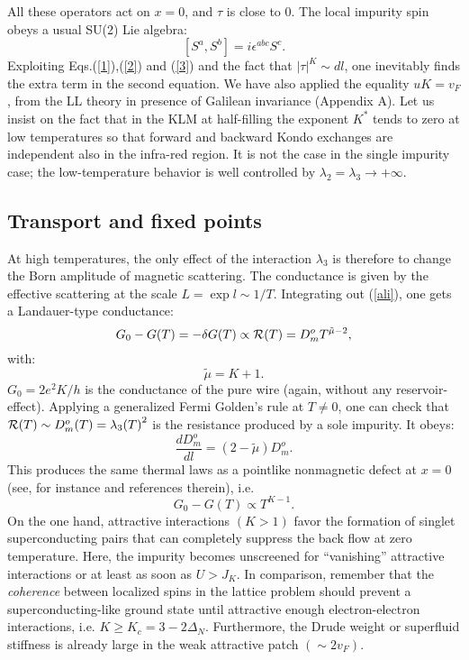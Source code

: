 All these operators act on $x=0$, and $\tau$ is close to 0.
The local impurity spin obeys a usual SU(2) Lie algebra:
\begin{equation}
\label{3}
[S^a,S^b]=i\epsilon^{abc}S^c.
\end{equation}
Exploiting Eqs.(\ref{1}),(\ref{2}) and (\ref{3})
and the fact that $\left|\tau\right|^K\sim dl$, one
inevitably finds the extra term in the second equation. We have also
applied the equality $uK=v_F$, from the LL theory in
presence of Galilean invariance (Appendix A).
Let
us insist on the fact that in the KLM at half-filling
the exponent $K^*$ tends to zero at
low temperatures so that
forward and backward Kondo exchanges are independent
also in the infra-red region.
It is not the case in the single impurity case;
the low-temperature behavior is well controlled by
$\lambda_2=\lambda_3\rightarrow +\infty$. 

\subsection{Transport and fixed points}

At high temperatures, the only effect of the interaction $\lambda_3$ is
therefore to change the Born amplitude of magnetic scattering.
The conductance is given by the effective scattering at
the scale $L=\exp l\sim 1/T$. Integrating out (\ref{ali}), one gets
a Landauer-type conductance:
\begin{equation}
G_0-G(T)=-\delta G(T)\propto {\cal R}(T)=D_m^{o}T^{\tilde{\mu}-2},
\end{equation}
with:
\begin{equation}
\tilde{\mu}=K+1. 
\end{equation}
$G_0=2e^2K/h$ 
is the conductance of the pure wire 
(again, without any reservoir-effect). Applying a generalized
Fermi Golden's rule at $T\neq 0$, one can check that
${\cal R}(T)\sim D_m^{o}(T)={\lambda_3(T)}^2$ is the resistance
 produced by a sole
impurity. It obeys:
\begin{equation}
\label{single-disorder-flow}
\frac{dD_m^o}{dl}=(2-\tilde{\mu})D_m^o.
\end{equation}
This produces the same thermal laws as a 
pointlike nonmagnetic
defect at $x=0$ (see, for instance\cite{Helene} and references
therein), i.e.
\begin{equation}
G_0-G(T)\propto T^{K-1}.
\end{equation}
\vskip 0.2cm
On the one hand, attractive interactions $(K>1)$ favor the formation of
singlet superconducting pairs that can completely
suppress the back flow at zero 
temperature. Here, the impurity becomes unscreened 
for ``vanishing'' attractive
interactions or at least as soon as $U>J_K$. In
comparison, remember that 
the {\it coherence} between localized spins in the lattice
problem
should prevent a superconducting-like ground state until attractive enough
electron-electron interactions, i.e. $K\geq K_c=3-2\Delta_N$. Furthermore, the
Drude weight or superfluid stiffness is already large
in the weak attractive patch $(\sim 2v_F)$.

